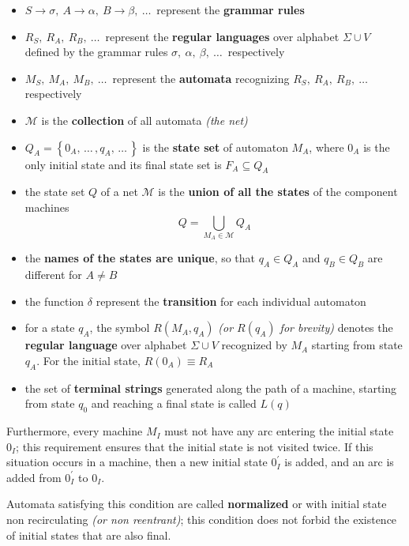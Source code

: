 \documentclass[english]{article}
\begin{document}
\begin{itemize}
  \item \(S \rightarrow \sigma, \ A \rightarrow \alpha, \ B \rightarrow \beta, \ \ldots\,\) represent the \textbf{grammar rules}
  \item \(R_S, \ R_A, \ R_B, \ \ldots\,\) represent the \textbf{regular languages} over alphabet \(\Sigma \cup V\) defined by the grammar rules \(\sigma, \ \alpha, \ \beta, \ \ldots\,\) respectively
  \item \(M_S, \ M_A, \ M_B, \ \ldots\,\) represent the \textbf{automata} recognizing \(R_S, \ R_A, \ R_B, \ \ldots\,\) respectively
  \item \(\mathcal{M}\) is the \textbf{collection} of all automata \textit{(the net)}
  \item \(Q_A = \left\{ 0_A, \, \ldots \, , q_A, \, \ldots \, \right\}\) is the \textbf{state set} of automaton \(M_A\), where \(0_A\) is the only initial state and its final state set is \(F_A \subseteq Q_A\)
  \item the state set \(Q\) of a net \(\mathcal{M}\) is the \textbf{union of all the states} of the component machines \[Q = \displaystyle \bigcup_{M_A \in \mathcal{M}} Q_A\]
  \item the \textbf{names of the states are unique}, so that \(q_A \in Q_A\) and \(q_B \in Q_B\) are different for \(A \neq B\)
  \item the function \(\delta\) represent the \textbf{transition} for each individual automaton
  \item for a state \(q_A\), the symbol \(R (M_A, q_A)\) \textit{(or \(R(q_A)\) for brevity)} denotes the \textbf{regular language} over alphabet \(\Sigma \cup V\) recognized by \(M_A\) starting from state \(q_A\). For the initial state, \(R(0_A) \equiv R_A\)
  \item the set of \textbf{terminal strings} generated along the path of a machine, starting from state \(q_0\) and reaching a final state is called \(L(q)\)
\end{itemize}

Furthermore, every machine \(M_I\) must not have any arc entering the initial state \(0_I\); this requirement ensures that the initial state is not visited twice.
If this situation occurs in a machine, then a new initial state \(0_I^\prime\) is added, and an arc is added from \(0^\prime_I\) to \(0_I\).

Automata satisfying this condition are called \textbf{normalized} or with initial state non recirculating \textit{(or non reentrant)};
this condition does not forbid the existence of initial states that are also final.
\end{document}
